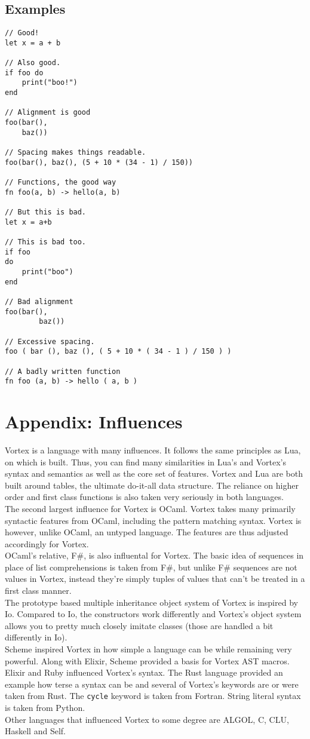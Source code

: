 \documentclass{article}
\begin{document}
\subsection{Examples}
\begin{lstlisting}[language=vortex]
// Good!
let x = a + b

// Also good.
if foo do
    print("boo!")
end

// Alignment is good
foo(bar(),
    baz())

// Spacing makes things readable.
foo(bar(), baz(), (5 + 10 * (34 - 1) / 150))

// Functions, the good way
fn foo(a, b) -> hello(a, b)

// But this is bad.
let x = a+b

// This is bad too.
if foo
do
    print("boo")
end

// Bad alignment
foo(bar(),
        baz())

// Excessive spacing.
foo ( bar (), baz (), ( 5 + 10 * ( 34 - 1 ) / 150 ) )

// A badly written function
fn foo (a, b) -> hello ( a, b )
\end{lstlisting}
\section{Appendix: Influences}
Vortex is a language with many influences. It follows the same principles as
Lua, on which is built. Thus, you can find many similarities in Lua's and
Vortex's syntax and semantics as well as the core set of features. Vortex and
Lua are both built around tables, the ultimate do-it-all data structure.
The reliance on higher order and first class functions is also taken very
seriously in both languages.\\
The second largest influence for Vortex is OCaml. Vortex takes many primarily
syntactic features from OCaml, including the pattern matching syntax. Vortex
is however, unlike OCaml, an untyped language. The features are thus adjusted
accordingly for Vortex.\\
OCaml's relative, F\#, is also influental for Vortex. The basic idea of
sequences in place of list comprehensions is taken from F\#, but unlike
F\# sequences are not values in Vortex, instead they're simply tuples
of values that can't be treated in a first class manner.\\
The prototype based multiple inheritance object system of Vortex is inspired
by Io. Compared to Io, the constructors work differently and Vortex's object
system allows you to pretty much closely imitate classes (those are handled
a bit differently in Io).\\
Scheme inspired Vortex in how simple a language can be while remaining very
powerful. Along with Elixir, Scheme provided a basis for Vortex AST macros.\\
Elixir and Ruby influenced Vortex's syntax. The Rust language provided an
example how terse a syntax can be and several of Vortex's keywords are or
were taken from Rust. The \verb|cycle| keyword is taken from Fortran.
String literal syntax is taken from Python.\\
Other languages that influenced Vortex to some degree are ALGOL, C, CLU,
Haskell and Self.
\end{document}

